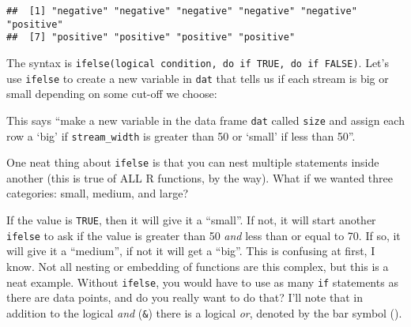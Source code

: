 \documentclass[]{book}
\newenvironment{Shaded}{\begin{snugshade}}{\end{snugshade}}
\newcommand{\KeywordTok}[1]{\textcolor[rgb]{0.13,0.29,0.53}{\textbf{#1}}}
\newcommand{\DecValTok}[1]{\textcolor[rgb]{0.00,0.00,0.81}{#1}}
\newcommand{\StringTok}[1]{\textcolor[rgb]{0.31,0.60,0.02}{#1}}
\newcommand{\OperatorTok}[1]{\textcolor[rgb]{0.81,0.36,0.00}{\textbf{#1}}}
\newcommand{\NormalTok}[1]{#1}
\theoremstyle{definition}
\theoremstyle{definition}
\theoremstyle{definition}
\theoremstyle{remark}
\begin{document}
\begin{verbatim}
##  [1] "negative" "negative" "negative" "negative" "negative" "positive"
##  [7] "positive" "positive" "positive" "positive"
\end{verbatim}

The syntax is
\texttt{ifelse(logical\ condition,\ do\ if\ TRUE,\ do\ if\ FALSE)}.
Let's use \texttt{ifelse} to create a new variable in \texttt{dat} that
tells us if each stream is big or small depending on some cut-off we
choose:

\begin{Shaded}
\end{Shaded}

This says ``make a new variable in the data frame \texttt{dat} called
\texttt{size} and assign each row a `big' if \texttt{stream\_width} is
greater than 50 or `small' if less than 50''.

One neat thing about \texttt{ifelse} is that you can nest multiple
statements inside another (this is true of ALL R functions, by the way).
What if we wanted three categories: small, medium, and large?

\begin{Shaded}
\end{Shaded}

If the value is \texttt{TRUE}, then it will give it a ``small''. If not,
it will start another \texttt{ifelse} to ask if the value is greater
than 50 \emph{and} less than or equal to 70. If so, it will give it a
``medium'', if not it will get a ``big''. This is confusing at first, I
know. Not all nesting or embedding of functions are this complex, but
this is a neat example. Without \texttt{ifelse}, you would have to use
as many \texttt{if} statements as there are data points, and do you
really want to do that? I'll note that in addition to the logical
\emph{and} (\texttt{\&}) there is a logical \emph{or}, denoted by the
bar symbol (\texttt{\textbar{}}).
\end{document}
